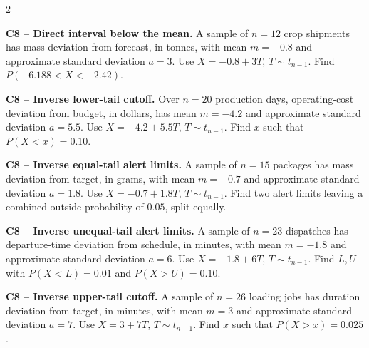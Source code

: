 \begin{multicols}{2}
\noindent\begin{minipage}{\linewidth}
\textbf{C8 -- Direct interval below the mean.} A sample of $n=12$ crop shipments has mass deviation from forecast, in tonnes, with mean $m=-0.8$ and approximate standard deviation $a=3$. Use $X=-0.8+3T$, $T\sim t_{n-1}$.
Find $P(-6.188<X<-2.42)$. 
\end{minipage}\par

\noindent\begin{minipage}{\linewidth}
\textbf{C8 -- Inverse lower-tail cutoff.} Over $n=20$ production days, operating-cost deviation from budget, in dollars, has mean $m=-4.2$ and approximate standard deviation $a=5.5$. Use $X=-4.2+5.5T$, $T\sim t_{n-1}$.
Find $x$ such that $P(X<x)=0.10$. 
\end{minipage}\par

\noindent\begin{minipage}{\linewidth}
\textbf{C8 -- Inverse equal-tail alert limits.} A sample of $n=15$ packages has mass deviation from target, in grams, with mean $m=-0.7$ and approximate standard deviation $a=1.8$. Use $X=-0.7+1.8T$, $T\sim t_{n-1}$.
Find two alert limits leaving a combined outside probability of $0.05$, split equally. 
\end{minipage}\par

\noindent\begin{minipage}{\linewidth}
\textbf{C8 -- Inverse unequal-tail alert limits.} A sample of $n=23$ dispatches has departure-time deviation from schedule, in minutes, with mean $m=-1.8$ and approximate standard deviation $a=6$. Use $X=-1.8+6T$, $T\sim t_{n-1}$.
Find $L,U$ with $P(X<L)=0.01$ and $P(X>U)=0.10$. 
\end{minipage}\par

\noindent\begin{minipage}{\linewidth}
\textbf{C8 -- Inverse upper-tail cutoff.} A sample of $n=26$ loading jobs has duration deviation from target, in minutes, with mean $m=3$ and approximate standard deviation $a=7$. Use $X=3+7T$, $T\sim t_{n-1}$.
Find $x$ such that $P(X>x)=0.025$. 
\end{minipage}\par


\end{multicols}
